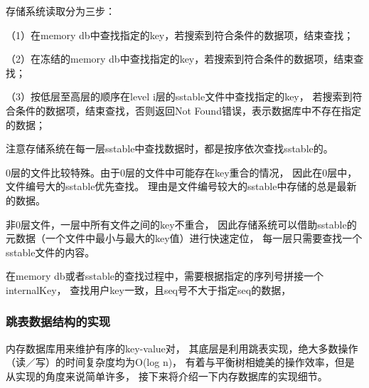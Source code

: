 \begin{enumerate}
		存储系统读取分为三步：

		（1）在memory db中查找指定的key，若搜索到符合条件的数据项，结束查找；

		（2）在冻结的memory db中查找指定的key，若搜索到符合条件的数据项，结束查找；
		
		（3）按低层至高层的顺序在level i层的sstable文件中查找指定的key，
		若搜索到符合条件的数据项，结束查找，否则返回Not Found错误，表示数据库中不存在指定的数据；

		注意存储系统在每一层sstable中查找数据时，都是按序依次查找sstable的。

		0层的文件比较特殊。由于0层的文件中可能存在key重合的情况，
		因此在0层中，文件编号大的sstable优先查找。
		理由是文件编号较大的sstable中存储的总是最新的数据。

		非0层文件，一层中所有文件之间的key不重合，
		因此存储系统可以借助sstable的元数据（一个文件中最小与最大的key值）进行快速定位，
		每一层只需要查找一个sstable文件的内容。

		在memory db或者sstable的查找过程中，需要根据指定的序列号拼接一个internalKey，
		查找用户key一致，且seq号不大于指定seq的数据，
		
		\end{enumerate}
	
		\subsubsection{跳表数据结构的实现}

		内存数据库用来维护有序的key-value对，
		其底层是利用跳表实现，绝大多数操作（读／写）的时间复杂度均为O(log n)，
		有着与平衡树相媲美的操作效率，但是从实现的角度来说简单许多，
		接下来将介绍一下内存数据库的实现细节。

